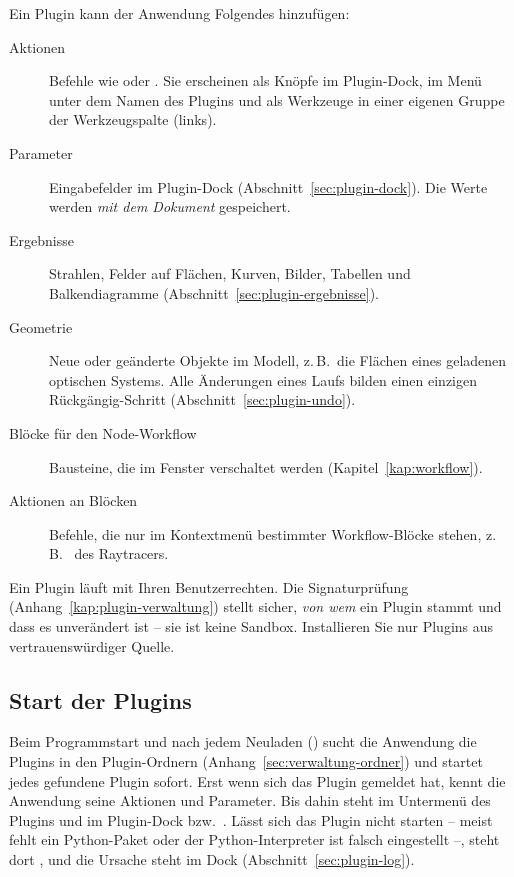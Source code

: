 Ein Plugin kann der Anwendung Folgendes hinzufügen:

\begin{description}
  \item[Aktionen] Befehle wie  oder . Sie erscheinen als
        Knöpfe im Plugin-Dock, im Menü  unter dem Namen des Plugins und als
        Werkzeuge in einer eigenen Gruppe der Werkzeugspalte (links).
  \item[Parameter] Eingabefelder im Plugin-Dock (Abschnitt~\ref{sec:plugin-dock}). Die Werte
        werden \emph{mit dem Dokument} gespeichert.
  \item[Ergebnisse] Strahlen, Felder auf Flächen, Kurven, Bilder, Tabellen und
        Balkendiagramme (Abschnitt~\ref{sec:plugin-ergebnisse}).
  \item[Geometrie] Neue oder geänderte Objekte im Modell, z.\,B.\ die Flächen eines geladenen
        optischen Systems. Alle Änderungen eines Laufs bilden einen einzigen Rückgängig-Schritt
        (Abschnitt~\ref{sec:plugin-undo}).
  \item[Blöcke für den Node-Workflow] Bausteine, die im Fenster 
        verschaltet werden (Kapitel~\ref{kap:workflow}).
  \item[Aktionen an Blöcken] Befehle, die nur im Kontextmenü bestimmter Workflow-Blöcke
        stehen, z.\,B.\  des Raytracers.
\end{description}

\begin{hinweis}
Ein Plugin läuft mit Ihren Benutzerrechten. Die Signaturprüfung
(Anhang~\ref{kap:plugin-verwaltung}) stellt sicher, \emph{von wem} ein Plugin stammt und dass
es unverändert ist – sie ist keine Sandbox. Installieren Sie nur Plugins aus vertrauenswürdiger
Quelle.
\end{hinweis}

\subsection{Start der Plugins}

Beim Programmstart und nach jedem Neuladen () sucht die Anwendung
die Plugins in den Plugin-Ordnern (Anhang~\ref{sec:verwaltung-ordner}) und startet jedes
gefundene Plugin sofort. Erst wenn sich das Plugin gemeldet hat, kennt die Anwendung seine
Aktionen und Parameter. Bis dahin steht im Untermenü des Plugins und im Plugin-Dock
 bzw.\ . Lässt sich das Plugin nicht starten – meist fehlt
ein Python-Paket oder der Python-Interpreter ist falsch eingestellt –, steht dort
, und die Ursache steht im Dock 
(Abschnitt~\ref{sec:plugin-log}).

